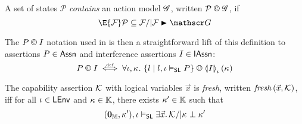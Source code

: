 \begin{definition}
A set of states $\mathcal P$ \emph{contains} an action model $\mathscr{G}$, written $\mathcal P \containI \gmod$, if
%
\[
  \E{\fence{}} \mathcal P\subseteq \fence{} /| \fence{} \strictfences \gmod
\]
\end{definition}
%
The $P\containI I$ notation used in \extendRule is then a straightforward lift of this definition to assertions $P \in \textsf{Assn}$ and interference assertions $I \in \textsf{IAssn}$:
%
\[
	P \containI I \iffdef \for{\lenv, \ca{}} \left\{l \mid l, \lenv \slsat P \right\} \containI \semI[\lenv]{I}(\ca{})
\]
%
\begin{definition}[Freshness]
The capability assertion $\mathcal{K}_{}$ with logical variables $\vec{x}$ is \emph{fresh}, written $\mathit{fresh}\left(\vec{x}, \mathcal{K}_{}\right)$, iff for all $\iota \in \textsf{LEnv}$ and $\kappa_{} \in \mathbb{K}$, there exists $\kappa_{}' \in \mathbb{K}$ such that
%
\[
	(\mathbf{0}_{\mathbb{M}}, \kappa_{}'), \iota \mathrel{\vDash_{\mathsf{SL}}} \exists \vec{x}.\, \mathcal{K}_{} /|  \kappa_{} \mathrel{\bot} \kappa_{}'
\]
%	
%
%
\end{definition}
%
%
